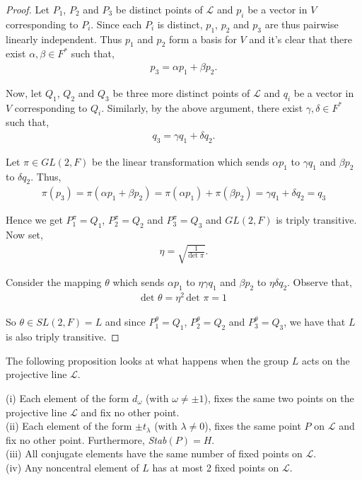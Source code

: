 \begin{proof} Let $P_1$, $P_2$ and $P_3$ be distinct points of $\mathscr{L}$ and $p_i$ be a vector in $V$ corresponding to $P_i$. Since each $P_i$ is distinct, $p_1$, $p_2$ and $p_3$ are thus pairwise linearly independent. Thus $p_1$ and $p_2$  form a basis for $V$ and it's clear that there exist $\alpha, \beta \in F^*$ such that,
\begin{align*} p_3 = \alpha p_1 + \beta p_2.
\end{align*}

Now, let $Q_1$, $Q_2$ and $Q_3$ be three more distinct points of $\mathscr{L}$ and $q_i$ be a vector in $V$ corresponding to $Q_i$. Similarly, by the above argument, there exist $\gamma, \delta \in F^*$ such that,
\begin{align*} q_3 = \gamma q_1 + \delta q_2.
\end{align*}

Let $\pi \in GL(2,F)$ be the linear transformation which sends $\alpha p_1$ to $\gamma q_1$  and $\beta p_2$ to $\delta q_2$. Thus,
\begin{align*} \pi(p_3) = \pi(\alpha p_1 + \beta p_2) = \pi(\alpha p_1) + \pi(\beta p_2) = \gamma q_1 + \delta q_2 = q_3 
\end{align*}

Hence we get $P^\pi_1 = Q_1$, $P^\pi_2 = Q_2$ and $P^\pi_3 = Q_3$ and $GL(2,F)$ is triply transitive. Now set,
\begin{align*} \eta = \sqrt{\frac{1}{\text{det }\pi}}.
\end{align*}

Consider the mapping $\theta$ which sends $\alpha p_1$ to $\eta \gamma q_1$ and $\beta p_2$ to $\eta \delta q_2$. Observe that,
\begin{align*} \text{det }\theta = \eta^2 \, \text{det } \pi = 1
\end{align*}

So $\theta \in SL(2,F) = L$ and since $P^\theta_1 = Q_1$, $P^\theta_2 = Q_2$ and $P^\theta_3 = Q_3$, we have that $L$ is also triply transitive. 

\end{proof}

The following proposition looks at what happens when the group $L$ acts on the projective line $\mathscr{L}$.

\begin{proposition} \label{6.7} (i) Each element of the form $d_\omega$ (with $\omega \neq \pm 1$), fixes the same two points on the projective line $\mathscr{L}$ and fix no other point. \vspace{3mm} \\
(ii) Each element of the form $\pm t_\lambda$ (with $\lambda \neq 0$), fixes the same point $P$ on $\mathscr{L}$ and fix no other point. Furthermore, \emph{Stab}$(P) = H$. \vspace{3mm} \\
(iii) All conjugate elements have the same number of fixed points on $\mathscr{L}$. \vspace{3mm} \\
(iv) Any noncentral element of $L$ has at most 2 fixed points on $\mathscr{L}$.
\end{proposition}

